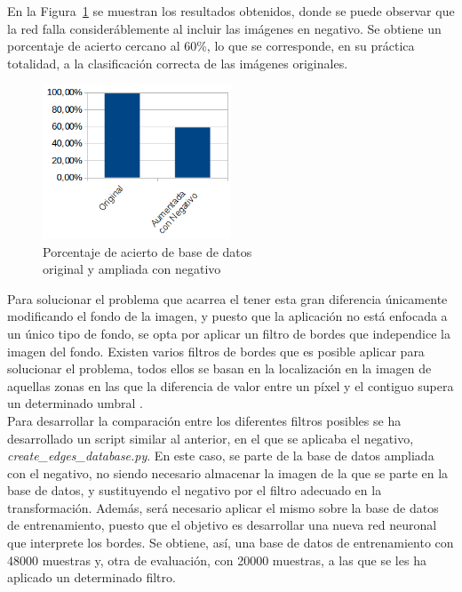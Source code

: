 En la Figura~\ref{fig.neg-orig} se muestran los resultados obtenidos, donde se puede observar que la red falla consideráblemente al incluir las imágenes en negativo. Se obtiene un porcentaje de acierto cercano al 60\%, lo que se corresponde, en su práctica totalidad, a la clasificación correcta de las imágenes originales.\\

\begin{figure}[H]
	\begin{center}
		\includegraphics[width=0.5\textwidth]{figures/orig_neg}
		\caption{Porcentaje de acierto de base de datos \\
			original y ampliada con negativo}
		\label{fig.neg-orig}
	\end{center}
\end{figure}

Para solucionar el problema que acarrea el tener esta gran diferencia únicamente modificando el fondo de la imagen, y puesto que la aplicación no está enfocada a un único tipo de fondo, se opta por aplicar un filtro de bordes que independice la imagen del fondo. Existen varios filtros de bordes que es posible aplicar para solucionar el problema, todos ellos se basan en la localización en la imagen de aquellas zonas en las que la diferencia de valor entre un píxel y el contiguo supera un determinado umbral \cite{fundamentos}.\\

Para desarrollar la comparación entre los diferentes filtros posibles se ha desarrollado un script similar al anterior, en el que se aplicaba el negativo, \textit{create\_edges\_database.py}. En este caso, se parte de la base de datos ampliada con el negativo, no siendo necesario almacenar la imagen de la que se parte en la base de datos, y sustituyendo el negativo por el filtro adecuado en la transformación. Además, será necesario aplicar el mismo sobre la base de datos de entrenamiento, puesto que el objetivo es desarrollar una nueva red neuronal que interprete los bordes. Se obtiene, así, una base de datos de entrenamiento con 48000 muestras y, otra de evaluación, con 20000 muestras, a las que se les ha aplicado un determinado filtro.\\

